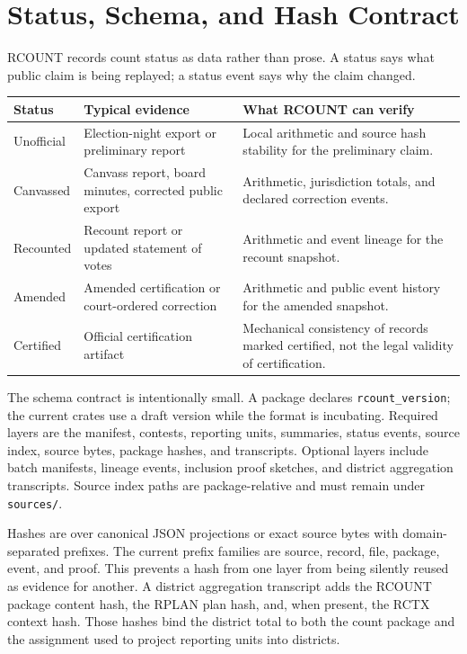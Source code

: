 \section{Status, Schema, and Hash Contract}

RCOUNT records count status as data rather than prose. A status says what public
claim is being replayed; a status event says why the claim changed.

\begin{center}
\small
\begin{tabularx}{\textwidth}{lXX}
\toprule
Status & Typical evidence & What RCOUNT can verify \\
\midrule
Unofficial & Election-night export or preliminary report & Local arithmetic and source hash stability for the preliminary claim. \\
Canvassed & Canvass report, board minutes, corrected public export & Arithmetic, jurisdiction totals, and declared correction events. \\
Recounted & Recount report or updated statement of votes & Arithmetic and event lineage for the recount snapshot. \\
Amended & Amended certification or court-ordered correction & Arithmetic and public event history for the amended snapshot. \\
Certified & Official certification artifact & Mechanical consistency of records marked certified, not the legal validity of certification. \\
\bottomrule
\end{tabularx}
\end{center}

The schema contract is intentionally small. A package declares
\texttt{rcount\_version}; the current crates use a draft version while the
format is incubating. Required layers are the manifest, contests, reporting
units, summaries, status events, source index, source bytes, package hashes, and
transcripts. Optional layers include batch manifests, lineage events, inclusion
proof sketches, and district aggregation transcripts. Source index paths are
package-relative and must remain under \texttt{sources/}.

Hashes are over canonical JSON projections or exact source bytes with
domain-separated prefixes. The current prefix families are source, record, file,
package, event, and proof. This prevents a hash from one layer from being
silently reused as evidence for another. A district aggregation transcript adds
the RCOUNT package content hash, the RPLAN plan hash, and, when present, the
RCTX context hash. Those hashes bind the district total to both the count
package and the assignment used to project reporting units into districts.

